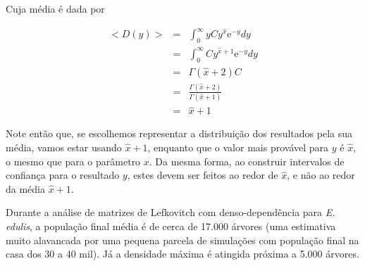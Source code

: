 Cuja m\'edia \'e dada por

\begin{eqnarray*}
	<D(y)> & = & \int_0^\infty y C y^{\hat x} \mathrm{e}^{-y} dy \\
	       & = & \int_0^\infty C y^{\hat x+1} \mathrm{e}^{-y} dy \\
		   & = & \Gamma(\hat x +2) C\\
	       & = & \frac{\Gamma(\hat x +2)}{\Gamma(\hat x + 1)} \\
		   & = & \hat x + 1
\end{eqnarray*}

Note ent\~ao que, se escolhemos representar a distribui\c c\~ao dos resultados pela sua m\'edia,
vamos estar usando $\hat x + 1$, enquanto que o valor mais prov\'avel para $y$ \'e $\hat x$, o mesmo
que para o par\^ametro $x$. Da mesma forma, ao construir intervalos de confian\c ca para o resultado
$y$, estes devem ser feitos ao redor de $\hat x$, e n\~ao ao redor da m\'edia $\hat x + 1$. 

Durante a an\'alise de matrizes de Lefkovitch com denso-depend\^encia para
{\em E. edulis}, a popula\c c\~ao final m\'edia \'e de cerca de 17.000 \'arvores (uma estimativa
muito alavancada por uma pequena parcela de simula\c c\~oes com popula\c c\~ao final na casa dos 30 a 40 mil).
J\'a a densidade m\'axima \'e atingida pr\'oxima a 5.000 \'arvores.
